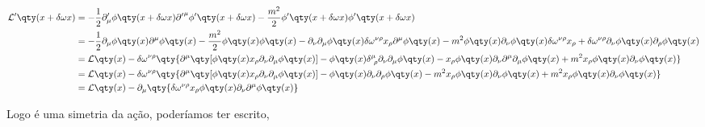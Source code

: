 \documentclass[twoside]{amsart}
\numberwithin{equation}{section}
\begin{document}
\begin{refsection}
\begin{align}
    \mathcal L'\qty(x+\delta\omega x)&=-\frac12\partial_\mu'\phi\qty(x+\delta \omega x){\partial'}^\mu\phi'\qty(x+\delta\omega x)-\frac{m^2}{2}\phi'\qty(x+\delta\omega x)\phi'\qty(x+\delta \omega x)\\
    &=-\frac12\partial_\mu\phi\qty(x)\partial^\mu\phi\qty(x)-\frac{m^2}{2}\phi\qty(x)\phi\qty(x)-\partial_\nu\partial_\mu\phi\qty(x)\delta\omega^{\nu\rho}x_{\rho}\partial^\mu\phi\qty(x)-m^2\phi\qty(x)\partial_\nu\phi\qty(x)\delta\omega^{\nu\rho}x_{\rho}+\delta\omega^{\nu\rho}\partial_\nu\phi\qty(x)\partial_\rho\phi\qty(x)\\
    &=\mathcal L\qty(x)-\delta\omega^{\nu\rho}\qty{\partial^\mu\qty[\phi\qty(x)x_\rho\partial_\nu\partial_\mu\phi\qty(x)]-\phi\qty(x)\delta^{\mu}_{\ \rho}\partial_\nu\partial_\mu\phi\qty(x)-x_\rho\phi\qty(x)\partial_\nu\partial^\mu\partial_\mu\phi\qty(x)+m^2x_\rho\phi\qty(x)\partial_\nu\phi\qty(x)}\\
    &=\mathcal L\qty(x)-\delta\omega^{\nu\rho}\qty{\partial^\mu\qty[\phi\qty(x)x_\rho\partial_\nu\partial_\mu\phi\qty(x)]-\phi\qty(x)\partial_\nu\partial_\rho\phi\qty(x)-m^2x_\rho\phi\qty(x)\partial_\nu\phi\qty(x)+m^2x_\rho\phi\qty(x)\partial_\nu\phi\qty(x)}\\
    &=\mathcal L\qty(x)-\partial_\mu\qty{\delta\omega^{\nu\rho}x_\rho\phi\qty(x)\partial_\nu\partial^\mu\phi\qty(x)}
\end{align}

Logo é uma simetria da ação, poderíamos ter escrito,


\end{refsection}
\end{document}
